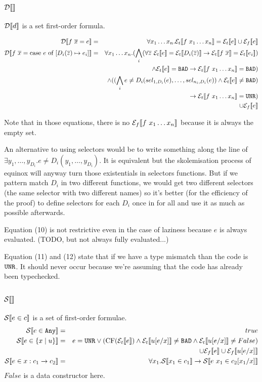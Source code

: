 \documentclass{article}
\begin{document}
\subsection{$\mathcal{D} \llbracket  \rrbracket$}
$\mathcal{D} \llbracket d \rrbracket$ is a set first-order formula.

\begin{eqnarray}
\mathcal{D} \llbracket f~\overline{x} = e \rrbracket &=& \forall x_1 \dots x_n.\mathcal{E}_t \llbracket f~x_1 \dots x_n \rrbracket = \mathcal{E}_t \llbracket e \rrbracket \cup \mathcal{E}_{f} \llbracket e \rrbracket\\
\mathcal{D} \llbracket f~\overline{x} = \mbox{case } e \mbox{ of } [D_i(\overline{z}) \mapsto e_i] \rrbracket &=& \forall x_1 \dots x_n.(\bigwedge_i (\forall \overline{z}~\mathcal{E}_t \llbracket e \rrbracket = \mathcal{E}_t \llbracket D_i(\overline{z}) \rrbracket \to \mathcal{E}_t \llbracket f~\overline{x} \rrbracket = \mathcal{E}_t \llbracket e_i \rrbracket)\\
&& \land \mathcal{E}_t \llbracket e \rrbracket = \texttt{BAD} \to \mathcal{E}_t \llbracket f~x_1 \dots x_n \rrbracket = \texttt{BAD})\\ 
&& \land ((\bigwedge_i e \neq D_i(sel_{1,D_i}(e),\dots,sel_{n_i,D_i}(e)) \land \mathcal{E}_t \llbracket e \rrbracket \neq \texttt{BAD})\\
&& ~~\to \mathcal{E}_t \llbracket f~x_1 \dots x_n \rrbracket = \texttt{UNR})\\
&& \cup \mathcal{E}_{f} \llbracket e \rrbracket
\end{eqnarray}

Note that in those equations, there is no $\mathcal{E}_{f} \llbracket f~x_1 \dots x_n \rrbracket$ because it is always the empty set.

An alternative to using selectors would be to write something along the line of $\exists y_1,\dots,y_{D_i}. e \neq D_i(y_1,\dots,y_{D_i})$. It is equivalent but the skolemisation process of equinox will anyway turn those existentials in selectors functions. But if we pattern match $D_i$ in two different functions, we would get two different selectors (the same selector with two different names) so it's better (for the efficiency of the proof) to define selectors for each $D_i$ once in for all and use it as much as possible afterwards.

Equation (10) is not restrictive even in the case of laziness because $e$ is always evaluated. (TODO, but not always fully evaluated...)

Equation (11) and (12) state that if we have a type mismatch than the code is $\texttt{UNR}$. It should never occur because we're assuming that the code has already been typechecked.


\subsection{$\mathcal{S} \llbracket  \rrbracket$}
$\mathcal{S} \llbracket e \in c \rrbracket$ is a set of first-order formulae.
\begin{eqnarray}
\mathcal{S} \llbracket e \in \texttt{Any} \rrbracket &=& true\\
\mathcal{S} \llbracket e \in \{x \mid u \} \rrbracket &=& e = \texttt{UNR} \lor (\mbox{CF}(\mathcal{E}_t \llbracket e \rrbracket) \land \mathcal{E}_t \llbracket u[e/x] \rrbracket \neq \texttt{BAD} \land \mathcal{E}_t \llbracket u[e/x] \rrbracket \neq False)\\
&& \cup \mathcal{E}_{f} \llbracket e \rrbracket \cup \mathcal{E}_{f} \llbracket u[e/x] \rrbracket\\
\mathcal{S} \llbracket e \in x:c_1 \to c_2 \rrbracket  &=& \forall x_1. \mathcal{S} \llbracket x_1 \in c_1 \rrbracket \to \mathcal{S} \llbracket e~x_1 \in c_2[x_1/x] \rrbracket
\end{eqnarray}
$False$ is a data constructor here.
\end{document}
